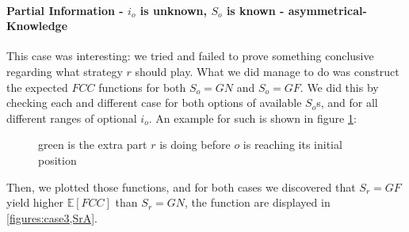 \documentclass[a4paper,english,10pt]{article}
\newcommand{\len}{15}
\newcommand\rob{\ensuremath{r}\xspace}
\newcommand\opp{\ensuremath{o}\xspace}
\newcommand{\fcc}{\ensuremath{FCC}\xspace}
\newcommand{\gn}{\ensuremath{GN}\xspace}
\newcommand{\gf}{\ensuremath{GF}\xspace}
\begin{document}
\paragraph{Partial Information - $i_\opp$ is unknown, $S_\opp$ is known - asymmetrical-Knowledge}
This case was interesting: we tried and failed to prove something conclusive regarding what strategy \rob should play.
What we did manage to do was construct the expected \fcc functions for both $S_\opp = \gn$ and $S_\opp = \gf$. We did this by checking each and different case for both options of available $S_\opp$s, and for all different ranges of optional $i_\opp$. An example for such is shown in figure \ref{figures:examples Sos utility}:

\begin{figure}
\caption{green is the extra part $r$ is doing before $o$ is reaching its initial position}
\label{figures:examples Sos utility}
\end{figure}


Then, we plotted those functions, and for both cases we discovered that $S_\rob = \gf$ yield higher $\mathbb{E}[\fcc]$ than $S_\rob = \gn$, the function  are displayed in \ref{figures:case3,SrA}.
\end{document}
